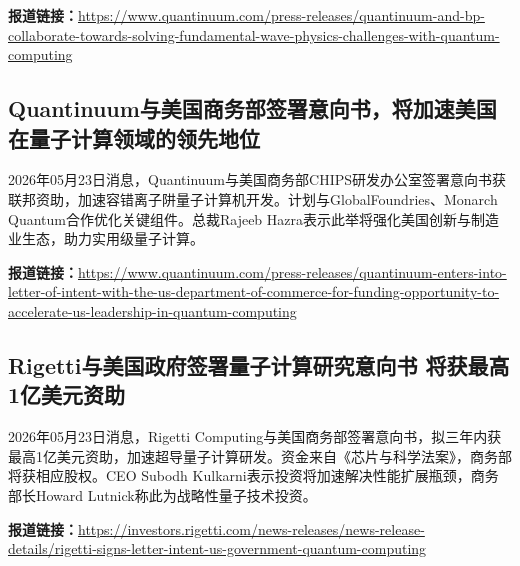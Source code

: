 \documentclass[12pt,a4paper]{ctexart}
\begin{document}
\noindent\textbf{报道链接：}\url{https://www.quantinuum.com/press-releases/quantinuum-and-bp-collaborate-towards-solving-fundamental-wave-physics-challenges-with-quantum-computing}

\subsection{ Quantinuum与美国商务部签署意向书，将加速美国在量子计算领域的领先地位 }

2026年05月23日消息，Quantinuum与美国商务部CHIPS研发办公室签署意向书获联邦资助，加速容错离子阱量子计算机开发。计划与GlobalFoundries、Monarch Quantum合作优化关键组件。总裁Rajeeb Hazra表示此举将强化美国创新与制造业生态，助力实用级量子计算。

\noindent\textbf{报道链接：}\url{https://www.quantinuum.com/press-releases/quantinuum-enters-into-letter-of-intent-with-the-us-department-of-commerce-for-funding-opportunity-to-accelerate-us-leadership-in-quantum-computing}

\subsection{ Rigetti与美国政府签署量子计算研究意向书 将获最高1亿美元资助 }

2026年05月23日消息，Rigetti Computing与美国商务部签署意向书，拟三年内获最高1亿美元资助，加速超导量子计算研发。资金来自《芯片与科学法案》，商务部将获相应股权。CEO Subodh Kulkarni表示投资将加速解决性能扩展瓶颈，商务部长Howard Lutnick称此为战略性量子技术投资。

\noindent\textbf{报道链接：}\url{https://investors.rigetti.com/news-releases/news-release-details/rigetti-signs-letter-intent-us-government-quantum-computing}
\end{document}
